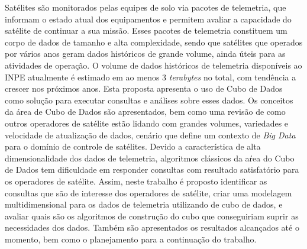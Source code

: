
\begin{resumo}

\hypertarget{estilo:resumo}{} %

Satélites são monitorados pelas equipes de solo via pacotes de telemetria, que informam o estado atual dos equipamentos e permitem avaliar a capacidade do satélite de continuar a sua missão.
Esses pacotes de telemetria constituem um corpo de dados de tamanho e alta complexidade, sendo que satélites que operados por vários anos geram dados históricos de grande volume, ainda úteis para as atividades de operação.
O volume de dados históricos de telemetria disponíveis ao INPE atualmente é estimado em ao menos 3 \textit{terabytes} no total, com tendência a crescer nos próximos anos.
Esta proposta apresenta o uso de Cubo de Dados como solução para executar consultas e análises sobre esses dados.
Os conceitos da área de Cubo de Dados são apresentados, bem como uma revisão de como outros operadores de satélite estão lidando com grandes volumes, variedades e velocidade de atualização de dados, cenário que define um contexto de \textit{Big Data} para o domínio de controle de satélites.
Devido a característica de alta dimensionalidade dos dados de telemetria, algoritmos clássicos da aŕea do Cubo de Dados tem dificuldade em responder consultas com resultado satisfatório para os operadores de satélite.
Assim, neste trabalho é proposto identificar as consultas que são de interesse dos operadores de satélite, criar uma modelagem multidimensional para os dados de telemetria utilizando de cubo de dados, e avaliar quais são os algoritmos de construção do cubo que conseguiriam suprir as necessidades dos dados.
Também são apresentados os resultados alcançados até o momento, bem como o planejamento para a continuação do trabalho.


\end{resumo}
